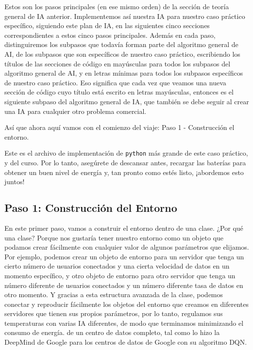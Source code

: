 \documentclass[
]{book}
\begin{document}
Estos son los pasos principales (en ese mismo orden) de la sección de teoría general de IA anterior. Implementemos así nuestra IA para nuestro caso práctico específico, siguiendo este plan de IA, en las siguientes cinco secciones correspondientes a estos cinco pasos principales. Además en cada paso, distinguiremos los subpasos que todavía forman parte del algoritmo general de AI, de los subpasos que son específicos de nuestro caso práctico, escribiendo los títulos de las secciones de código en mayúsculas para todos los subpasos del algoritmo general de AI, y en letras mínimas para todos los subpasos específicos de nuestro caso práctico. Eso significa que cada vez que veamos una nueva sección de código cuyo título está escrito en letras mayúsculas, entonces es el siguiente subpaso del algoritmo general de IA, que también se debe seguir al crear una IA para cualquier otro problema comercial.

Así que ahora aquí vamos con el comienzo del viaje: Paso 1 - Construcción el entorno.

Este es el archivo de implementación de \texttt{python} más grande de este caso práctico, y del curso. Por lo tanto, asegúrete de descansar antes, recargar las baterías para obtener un buen nivel de energía y, tan pronto como estés listo, ¡abordemos esto juntos!

\hypertarget{paso-1-construcciuxf3n-del-entorno}{%
\subsection{Paso 1: Construcción del Entorno}\label{paso-1-construcciuxf3n-del-entorno}}

En este primer paso, vamos a construir el entorno dentro de una clase. ¿Por qué una clase? Porque nos gustaría tener nuestro entorno como un objeto que podamos crear fácilmente con cualquier valor de algunos parámetros que elijamos. Por ejemplo, podemos crear un objeto de entorno para un servidor que tenga un cierto número de usuarios conectados y una cierta velocidad de datos en un momento específico, y otro objeto de entorno para otro servidor que tenga un número diferente de usuarios conectados y un número diferente tasa de datos en otro momento. Y gracias a esta estructura avanzada de la clase, podemos conectar y reproducir fácilmente los objetos del entorno que creamos en diferentes servidores que tienen sus propios parámetros, por lo tanto, regulamos sus temperaturas con varias IA diferentes, de modo que terminamos minimizando el consumo de energía. de un centro de datos completo, tal como lo hizo la DeepMind de Google para los centros de datos de Google con su algoritmo DQN.
\end{document}
